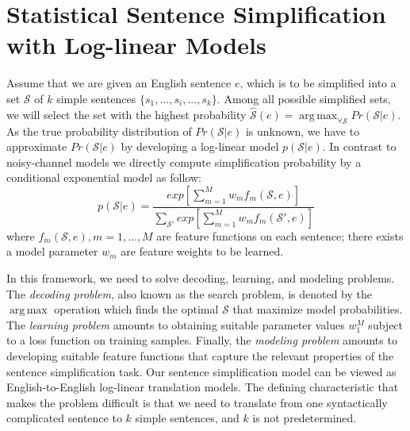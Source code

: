 \documentclass[10pt]{article}
\DeclareMathOperator*{\argmax}{arg\,max}
\begin{document}




\section{Statistical Sentence Simplification with Log-linear Models}
\label{sec:Model}


Assume that we are given an English sentence $e$, which is to be simplified into a set $\mathcal{S}$ of $k$ simple sentences $\{s_1, ...,s_i, ..., s_k\}$.
Among all possible simplified sets, we will select the set with the highest probability
$ \hat{\mathcal{S}}(e) = \argmax_{\forall \mathcal{S}} Pr(\mathcal{S}|e)$.
As the true probability distribution of $Pr(\mathcal{S}|e)$ is unknown, we have to approximate $Pr(\mathcal{S}|e)$ by developing a log-linear model $p(\mathcal{S}|e)$.
In contrast to noisy-channel models \cite{Knight-Marcu:2002,Turner:2005} we directly compute simplification probability by a conditional exponential model as follow:
\begin{equation}
p(\mathcal{S}|e) = \frac{exp [ \sum_{m=1}^{M} w_m f_m(\mathcal{S},e) ] }{ \sum_{\mathcal{S}'} exp [ \sum_{m=1}^{M} w_m f_m(\mathcal{S}',e) ] }
\label{equ::model}
\end{equation}
where $f_m(\mathcal{S},e), m = 1,..., M$ are feature functions on each sentence; there exists a model parameter $w_m$ are feature weights to be learned.


In this framework, we need to solve decoding, learning, and modeling problems.
The \textit{decoding problem}, also known as the search problem, is denoted by the $\argmax$ operation which finds the optimal $\mathcal{S}$ that maximize model probabilities.
The \textit{learning problem} amounts to obtaining suitable parameter values $w_1^M$ subject to a loss function on training samples.
Finally, the \textit{modeling problem} amounts to developing suitable feature functions that capture the relevant properties of the sentence simplification task.
Our sentence simplification model can be viewed as English-to-English log-linear translation models. 
The defining characteristic that makes the problem difficult is that we need to translate from one syntactically complicated sentence to $k$ simple sentences, and $k$ is not predetermined.
\end{document}
